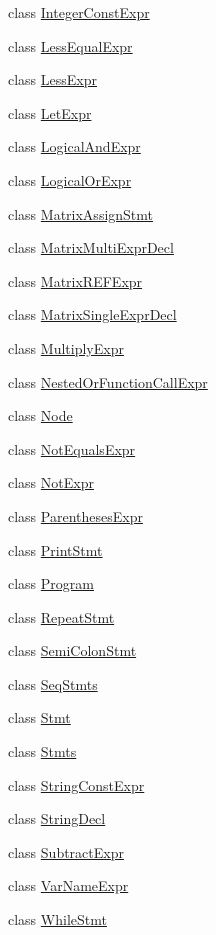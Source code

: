 \begin{DoxyCompactItemize}
\item 
class \hyperlink{classfcal_1_1ast_1_1IntegerConstExpr}{Integer\+Const\+Expr}
\item 
class \hyperlink{classfcal_1_1ast_1_1LessEqualExpr}{Less\+Equal\+Expr}
\item 
class \hyperlink{classfcal_1_1ast_1_1LessExpr}{Less\+Expr}
\item 
class \hyperlink{classfcal_1_1ast_1_1LetExpr}{Let\+Expr}
\item 
class \hyperlink{classfcal_1_1ast_1_1LogicalAndExpr}{Logical\+And\+Expr}
\item 
class \hyperlink{classfcal_1_1ast_1_1LogicalOrExpr}{Logical\+Or\+Expr}
\item 
class \hyperlink{classfcal_1_1ast_1_1MatrixAssignStmt}{Matrix\+Assign\+Stmt}
\item 
class \hyperlink{classfcal_1_1ast_1_1MatrixMultiExprDecl}{Matrix\+Multi\+Expr\+Decl}
\item 
class \hyperlink{classfcal_1_1ast_1_1MatrixREFExpr}{Matrix\+R\+E\+F\+Expr}
\item 
class \hyperlink{classfcal_1_1ast_1_1MatrixSingleExprDecl}{Matrix\+Single\+Expr\+Decl}
\item 
class \hyperlink{classfcal_1_1ast_1_1MultiplyExpr}{Multiply\+Expr}
\item 
class \hyperlink{classfcal_1_1ast_1_1NestedOrFunctionCallExpr}{Nested\+Or\+Function\+Call\+Expr}
\item 
class \hyperlink{classfcal_1_1ast_1_1Node}{Node}
\item 
class \hyperlink{classfcal_1_1ast_1_1NotEqualsExpr}{Not\+Equals\+Expr}
\item 
class \hyperlink{classfcal_1_1ast_1_1NotExpr}{Not\+Expr}
\item 
class \hyperlink{classfcal_1_1ast_1_1ParenthesesExpr}{Parentheses\+Expr}
\item 
class \hyperlink{classfcal_1_1ast_1_1PrintStmt}{Print\+Stmt}
\item 
class \hyperlink{classfcal_1_1ast_1_1Program}{Program}
\item 
class \hyperlink{classfcal_1_1ast_1_1RepeatStmt}{Repeat\+Stmt}
\item 
class \hyperlink{classfcal_1_1ast_1_1SemiColonStmt}{Semi\+Colon\+Stmt}
\item 
class \hyperlink{classfcal_1_1ast_1_1SeqStmts}{Seq\+Stmts}
\item 
class \hyperlink{classfcal_1_1ast_1_1Stmt}{Stmt}
\item 
class \hyperlink{classfcal_1_1ast_1_1Stmts}{Stmts}
\item 
class \hyperlink{classfcal_1_1ast_1_1StringConstExpr}{String\+Const\+Expr}
\item 
class \hyperlink{classfcal_1_1ast_1_1StringDecl}{String\+Decl}
\item 
class \hyperlink{classfcal_1_1ast_1_1SubtractExpr}{Subtract\+Expr}
\item 
class \hyperlink{classfcal_1_1ast_1_1VarNameExpr}{Var\+Name\+Expr}
\item 
class \hyperlink{classfcal_1_1ast_1_1WhileStmt}{While\+Stmt}
\end{DoxyCompactItemize}
